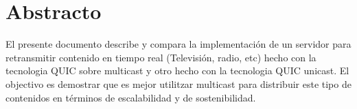 \section*{Abstracto}

{
    El presente documento describe y compara la implementación de un servidor para retransmitir contenido en tiempo real (Televisión, radio, etc) hecho con
    la tecnologia QUIC sobre multicast y otro hecho con la tecnologia QUIC unicast. El objectivo es demostrar que es mejor utilitzar
    multicast para distribuir este tipo de contenidos en términos de escalabilidad y de sostenibilidad.
}
